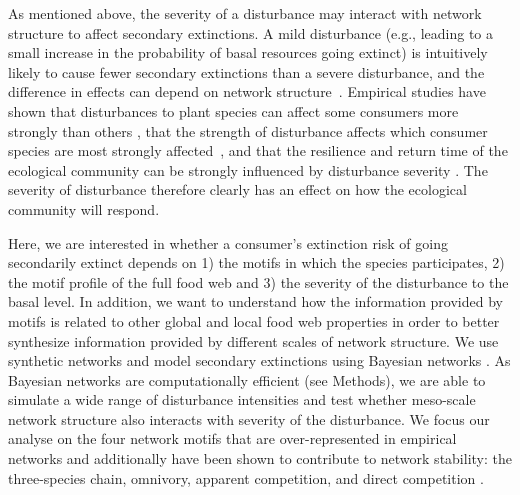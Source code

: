 \documentclass[12pt]{article}
\begin{document}
\begin{spacing}{2.0}
    As mentioned above, the severity of a disturbance may interact with network structure to affect secondary extinctions.
    A mild disturbance (e.g., leading to a small increase in the probability of basal resources going extinct) is intuitively likely to cause fewer secondary extinctions than a severe disturbance, and the difference in effects can depend on network structure~\citep{Baumgartner2015}.
    Empirical studies have shown that disturbances to plant species can affect some consumers more strongly than others \citep{byrnes2011climate}, that the strength of disturbance affects which consumer species are most strongly affected~\citep{detmer2021variation,carnell2020more}, and that the resilience and return time of the ecological community can be strongly influenced by disturbance severity \citep{rydgren2004disturbance}. 
    The severity of disturbance therefore clearly has an effect on how the ecological community will respond. 

    


    Here, we are interested in whether a consumer's extinction risk of going secondarily extinct depends on 1) the motifs in which the species participates, 2) the motif profile of the full food web and 3) the severity of the disturbance to the basal level. %
    In addition, we want to understand how the information provided by motifs is related to other global and local food web properties in order to better synthesize information provided by different scales of network structure.
    We use synthetic networks and model secondary extinctions using Bayesian networks \citep{Eklof2013, Haussler2020}. 
    As Bayesian networks are computationally efficient (see Methods), we are able to simulate a wide range of disturbance intensities and test whether meso-scale network structure also interacts with severity of the disturbance.
    We focus our analyse on the four network motifs that are over-represented in empirical networks and additionally have been shown to contribute to network stability: the three-species chain, omnivory, apparent competition, and direct competition \citep{Stouffer2007, Borrelli2015a, giling2019plant}.
   
    




\end{spacing}
\end{document}
